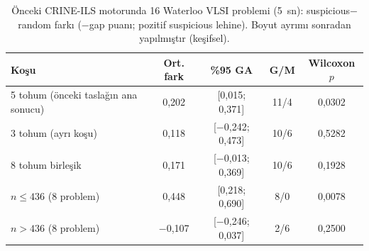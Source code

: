 \begin{table}[!htbp]
\centering\small\setlength{\tabcolsep}{4pt}
\caption{Önceki CRINE-ILS motorunda 16 Waterloo VLSI problemi (5~sn): suspicious$-$random farkı ($-$gap puanı; pozitif suspicious lehine). Boyut ayrımı sonradan yapılmıştır (keşifsel).}
\label{tab:v2-old-reanalysis}
\begin{tabular*}{\textwidth}{@{\extracolsep{\fill}}lcccc}
\toprule
Koşu & Ort. fark & \%95 GA & G/M & Wilcoxon $p$ \\
\midrule
5 tohum (önceki taslağın ana sonucu) & 0{,}202 & [0{,}015; 0{,}371] & 11/4 & 0{,}0302 \\
3 tohum (ayrı koşu) & 0{,}118 & [$-$0{,}242; 0{,}473] & 10/6 & 0{,}5282 \\
8 tohum birleşik & 0{,}171 & [$-$0{,}013; 0{,}369] & 10/6 & 0{,}1928 \\
\quad $n\le436$ (8 problem) & 0{,}448 & [0{,}218; 0{,}690] & 8/0 & 0{,}0078 \\
\quad $n>436$ (8 problem) & $-$0{,}107 & [$-$0{,}246; 0{,}037] & 2/6 & 0{,}2500 \\
\bottomrule
\end{tabular*}
\end{table}
